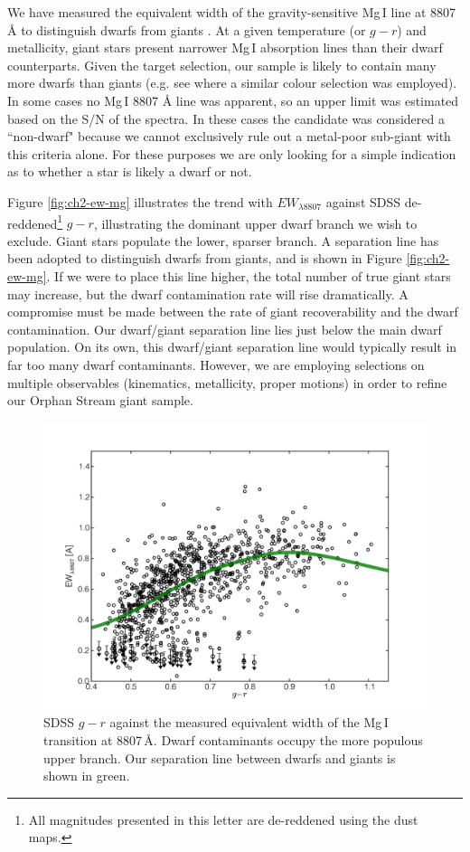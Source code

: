 We have measured the equivalent width of the gravity-sensitive Mg\,\textsc{I} line at 8807 \AA{} to distinguish dwarfs from giants \citep{Battaglia_Starkenburg_2012}. At a given temperature (or $g - r$) and metallicity, giant stars present narrower Mg\,\textsc{I} absorption lines than their dwarf counterparts. Given the target selection, our sample is likely to contain many more dwarfs than giants (e.g. see \citet{Casey_et-al_2012} where a similar colour selection was employed). In some cases no Mg\,\textsc{I} 8807 \AA{} line was apparent, so an upper limit was estimated based on the S/N of the spectra. In these cases the candidate was considered a ``non-dwarf" because we cannot exclusively rule out a metal-poor sub-giant with this criteria alone. For these purposes we are only looking for a simple indication as to whether a star is likely a dwarf or not. 

Figure \ref{fig:ch2-ew-mg} illustrates the trend with $EW_{\lambda8807}$ against SDSS de-reddened\footnote{All magnitudes presented in this letter are de-reddened using the \citet{Schlegel_Finkbeiner_Davis_1998} dust maps.} $g - r$, illustrating the dominant upper dwarf branch we wish to exclude. Giant stars populate the lower, sparser branch. A separation line has been adopted to distinguish dwarfs from giants, and is shown in Figure \ref{fig:ch2-ew-mg}. If we were to place this line higher, the total number of true giant stars may increase, but the dwarf contamination rate will rise dramatically. A compromise must be made between the rate of giant recoverability and the dwarf contamination. Our  dwarf/giant separation line lies just below the main dwarf population. On its own, this dwarf/giant separation line would typically result in far too many dwarf contaminants. However, we are  employing selections on multiple observables (kinematics, metallicity, proper motions) in order to refine our Orphan Stream giant sample. 

\begin{figure}[h]
	\includegraphics[width=\columnwidth]{./chapter2/fig2.pdf}
	\caption{SDSS $g - r$ against the measured equivalent width of the Mg\,\textsc{I} transition at 8807\,\AA{}. Dwarf contaminants occupy the more populous upper branch. Our separation line between dwarfs and giants is shown in green.}
	\label{fig:ew-mg}
\end{figure}

